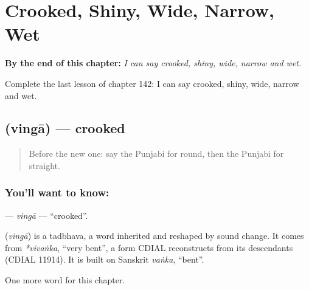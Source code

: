 
\chapter{Crooked, Shiny, Wide, Narrow, Wet}
\label{ch:pa-crooked-shiny-wide-narrow-wet}

\begin{chapteropening}
\textbf{By the end of this chapter:} \emph{I can say crooked, shiny, wide, narrow and wet.}

Complete the last lesson of chapter 142: I can say crooked, shiny, wide, narrow and wet.
\end{chapteropening}

\section[\texorpdfstring{\pa{ਵਿੰਗਾ} (vingā)}{ਵਿੰਗਾ (vingā)}]{ (vingā) — crooked}

\label{lesson:PA-C142-vinga}



\begin{quote}
Before the new one: say the Punjabi for round, then the Punjabi for straight.
\end{quote}

\subsection*{You'll want to know: }
\textbf{} — \emph{vingā} — \textquotedblleft{}crooked\textquotedblright{}.

\begin{cousinweb}
\textbf{} (\emph{vingā}) is a tadbhava, a word inherited and reshaped by sound change. It comes from \emph{*vivaṅka}, \textquotedblleft{}very bent\textquotedblright{}, a form CDIAL reconstructs from its descendants (CDIAL 11914). It is built on Sanskrit \emph{vaṅka}, \textquotedblleft{}bent\textquotedblright{}.
\end{cousinweb}

\begin{grammarlens}[title={What you've built}]
One more word for this chapter.
\end{grammarlens}

